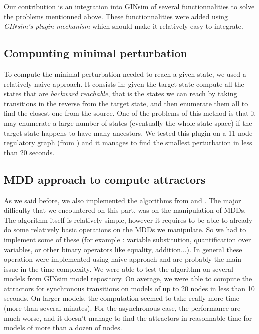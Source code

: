 \documentclass[a4paper,11pt]{article}
\begin{document}

Our contribution is an integration into GINsim of several functionnalities to
solve the problems mentionned above. These functionnalities were added using
\emph{GINsim's plugin mechanism} which should make it relatively easy to
integrate.

\subsection{Compunting minimal perturbation}
To compute the minimal perturbation needed to reach a given state, we used a
relatively naive approach. It consists in: given the target state compute all
the states that are \emph{backward reachable}, that is the states we can reach
by taking transitions in the reverse from the target state, and then enumerate
them all to find the closest one from the source. One of the problems of this
method is that it may enumerate a large number of states (eventually the whole
state space) if the target state happens to have many ancestors. We tested this
plugin on a 11 node regulatory graph (from \cite{Bonzanni}) and it manages to
find the smallest perturbation in less than 20 seconds.

\subsection{MDD approach to compute attractors}
As we said before, we also implemented the algorithms from \cite{Garg} and
\cite{Zheng}. The major difficulty that we encountered on this part, was on the
manipulation of MDDs. The algorithm itself is relatively simple, however it
requires to be able to already do some relatively basic operations on the MDDs
we manipulate. So we had to implement some of these (for example : variable
substitution, quantification over variables, or other binary operators like
equality, addition...). In general these operation were implemented using naive
approach and are probably the main issue in the time complexity. We were able to
test the algorithm on several models from GINsim model repository. On average,
we were able to compute the attractors for synchronous transitions on models of
up to 20 nodes in less than 10 seconds. On larger models, the computation seemed
to take really more time (more than several minutes). For the asynchronous case,
the performance are much worse, and it doesn't manage to find the attractors in
reasonnable time for models of more than a dozen of nodes.
\end{document}
